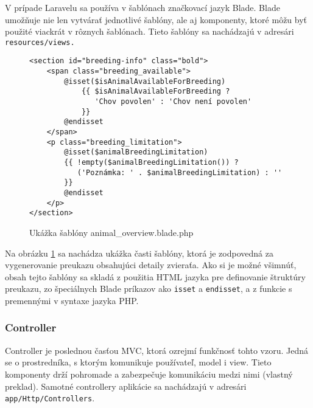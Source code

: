 V prípade Laravelu sa používa v šablónach značkovací jazyk Blade. Blade umožňuje nie len vytvárať jednotlivé šablóny, ale aj komponenty, ktoré môžu byť použité viackrát v rôznych šablónach. Tieto šablóny sa nachádzajú v adresári \texttt{resources/views.}

\begin{figure}[H]
\begin{minipage}[]{\linewidth}
\begin{verbatim}
<section id="breeding-info" class="bold">
    <span class="breeding_available">
        @isset($isAnimalAvailableForBreeding)
            {{ $isAnimalAvailableForBreeding ?
               'Chov povolen' : 'Chov není povolen' 
            }}
        @endisset
    </span>
    <p class="breeding_limitation">
        @isset($animalBreedingLimitation)
        {{ !empty($animalBreedingLimitation()) ?
           ('Poznámka: ' . $animalBreedingLimitation) : '' 
        }}
        @endisset
    </p>
</section>
\end{verbatim}
\end{minipage}
\caption[Ukážka šablóny animal\_overview.blade.php]
{Ukážka šablóny animal\_overview.blade.php}
\label{animal-overview-view-code}
\end{figure}

Na obrázku \ref{animal-overview-view-code} sa nachádza ukážka časti šablóny, ktorá je zodpovedná za vygenerovanie preukazu obsahujúci detaily zvieraťa. Ako si je možné všimnúť, obsah tejto šablóny sa skladá z použitia HTML jazyka pre definovanie štruktúry preukazu, zo špeciálnych Blade príkazov ako \texttt{isset} a \texttt{endisset}, a z funkcie s premennými v syntaxe jazyka PHP.\pagebreak

\subsubsection{Controller}
Controller je poslednou časťou MVC, ktorá ozrejmí funkčnosť tohto vzoru. Jedná se o prostredníka, s ktorým komunikuje používateľ, model i view. Tieto komponenty drží pohromade a zabezpečuje komunikáciu medzi nimi \cite{mvc-architektura} (vlastný preklad). Samotné controllery aplikácie sa nachádzajú v adresári \texttt{app/Http/Controllers}.

